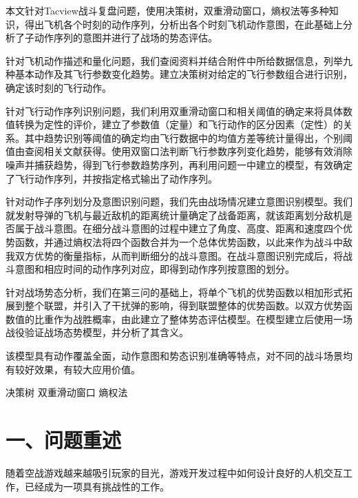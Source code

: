 \documentclass{my_paper}
\begin{document}
\newpage
\begin{center}
\lunwenbiaoti

\vspace{2ex}
\zhaiyao
\end{center}

本文针对Tacview战斗复盘问题，使用决策树，双重滑动窗口，熵权法等多种知识，得出飞机各个时刻的动作序列，分析出各个时刻飞机动作意图，在此基础上分析了子动作序列的意图并进行了战场的势态评估。

针对飞机动作描述和量化问题，我们查阅资料并结合附件中所给数据信息，列举九种基本动作及其飞行参数变化趋势。建立决策树对给定的飞行参数组合进行识别，确定该时刻的飞行动作。

针对飞行动作序列识别问题，我们利用双重滑动窗口和相关阈值的确定来将具体数值转换为定性的评价，建立了参数值（定量）和飞行动作的区分因素（定性）的关系。其中趋势识别等阈值的确定均由飞行数据中的均值方差等统计量得出，个别阈值由查阅相关文献获得。使用双窗口法判断飞行参数序列变化趋势，能够有效消除噪声并捕获趋势，得到飞行参数趋势序列，再利用问题一中建立的模型，有效确定了飞行动作序列，并按指定格式输出了动作序列。

针对动作子序列划分及意图识别问题，我们先由战场情况建立意图识别模型。我们就发射导弹的飞机与最近敌机的距离统计量确定了战备距离，就该距离划分敌机是否属于战斗意图。在细分战斗意图的过程中建立了角度、高度、距离和速度四个优势函数，并通过熵权法将四个函数合并为一个总体优势函数，以此来作为战斗中敌我双方优势的衡量指标，从而判断细分的战斗意图。在战斗意图识别完成后，将战斗意图和相应时间的动作序列对应，即得到动作序列按意图的划分。

针对战场势态分析，我们在第三问的基础上，将单个飞机的优势函数以相加形式拓展到整个联盟，并引入了干扰弹的影响，得到联盟整体的优势函数。以双方优势函数值的比重作为战胜概率，由此建立了整体势态评估模型。在模型建立后使用一场战役验证战场态势模型，并分析了其含义。

该模型具有动作覆盖全面，动作意图和势态识别准确等特点，对不同的战斗场景均有较好效果，有较大应用价值。

\begin{guanjianci}

 决策树 \quad 双重滑动窗口 \quad 熵权法
\end{guanjianci}

\newpage
\section{一、问题重述}

随着空战游戏越来越吸引玩家的目光，游戏开发过程中如何设计良好的人机交互工作，已经成为一项具有挑战性的工作。
\end{document}
